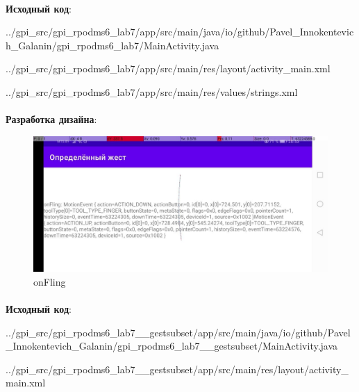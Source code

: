 \documentclass[12pt, a4paper, simple]{eskdtext}
\begin{document}
    \paragraph{} \textbf{Исходный код}: 

    
        {../gpi_src/gpi_rpodms6_lab7/app/src/main/java/io/github/Pavel_Innokentevich_Galanin/gpi_rpodms6_lab7/MainActivity.java}

    
        {../gpi_src/gpi_rpodms6_lab7/app/src/main/res/layout/activity_main.xml}

    
        {../gpi_src/gpi_rpodms6_lab7/app/src/main/res/values/strings.xml}

    \newpage

    \paragraph{} \textbf{Разработка дизайна}:

    \begin{figure}[h!]
        \centering
        \includegraphics[width=12cm]
            {_assets/GestSubset__onFling.jpg}
        \caption{onFling}
    \end{figure}
 
    \paragraph{} \textbf{Исходный код}: 

    
        {../gpi_src/gpi_rpodms6_lab7__gestsubset/app/src/main/java/io/github/Pavel_Innokentevich_Galanin/gpi_rpodms6_lab7__gestsubset/MainActivity.java}

    
        {../gpi_src/gpi_rpodms6_lab7__gestsubset/app/src/main/res/layout/activity_main.xml}
\end{document}
